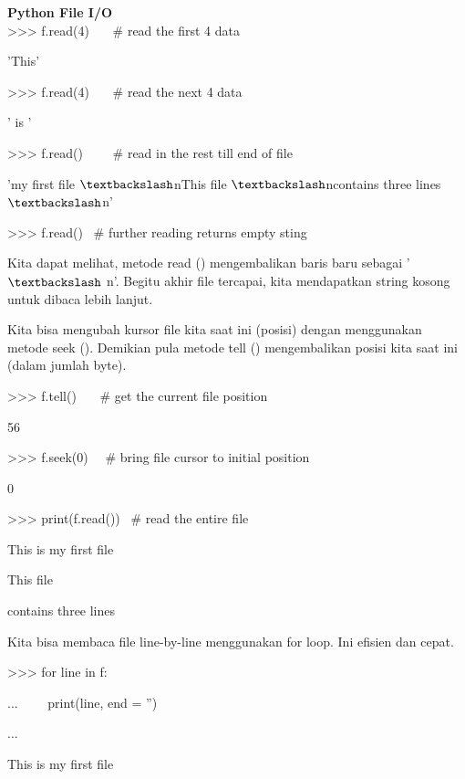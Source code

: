 \begin{center}{\fontsize{24pt}{24pt}\selectfont \textbf{Python File I/O} \\}
>>> f.read(4)~~~  $  \#  $ read the first 4 data \

'This' 
\vspace{12pt}

>>> f.read(4)~~~  $  \#  $ read the next 4 data 

' is ' 
\vspace{12pt}
 
>>> f.read()~~~~  $  \#  $ read in the rest till end of file 

'my first file $  \textbackslash  $nThis file $  \textbackslash  $ncontains three lines $  \textbackslash  $n' 
\vspace{12pt}
 
>>> f.read()~  $  \#  $ further reading returns empty sting 
\vspace{12pt}
\vspace{12pt}

Kita dapat melihat, metode read () mengembalikan baris baru sebagai ' $  \textbackslash  $ n'. Begitu akhir file tercapai, kita mendapatkan string kosong untuk dibaca lebih lanjut. 
\vspace{12pt}

Kita bisa mengubah kursor file kita saat ini (posisi) dengan menggunakan metode seek (). Demikian pula metode tell () mengembalikan posisi kita saat ini (dalam jumlah byte). 
\vspace{12pt}

>>> f.tell()~~~  $  \#  $ get the current file position 

56 
\vspace{12pt}
 
>>> f.seek(0)~~  $  \#  $ bring file cursor to initial position 

0 
\vspace{12pt}
 
>>> print(f.read())~  $  \#  $ read the entire file 

This is my first file

This file 

contains three lines 
\vspace{12pt}
\vspace{16pt}
 
Kita bisa membaca file line-by-line menggunakan for loop. Ini efisien dan cepat. 
\vspace{12pt}

>>> for line in f: 

...~~~~ print(line, end = '') 

... 

This is my first file 


\end{center}
